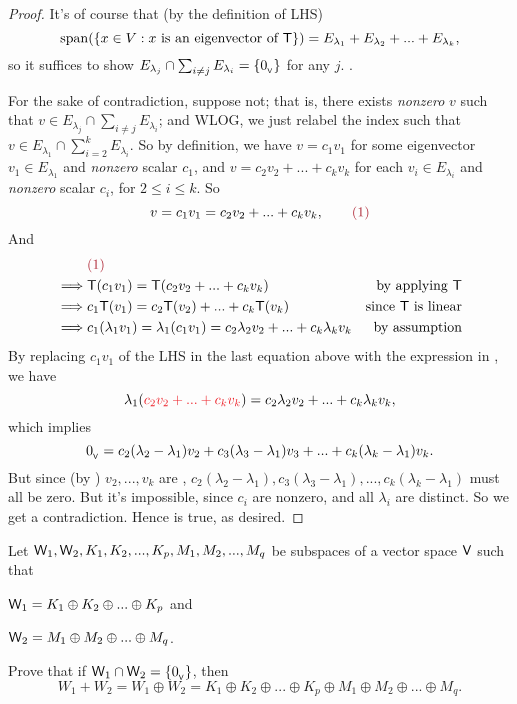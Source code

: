 \begin{proof}
It's of course that (by the definition of LHS)
\[
    \operatorname{span}(\{ x \in V: x \text{ is an eigenvector of } \textsf{T} \}) = E_{\lambda_1} + E_{\lambda_2} + ... + E_{\lambda_k},
\]
so it suffices to show \(E_{\lambda_j} \cap \sum_{i \ne j} E_{\lambda_i} = \{ 0_{_{\textsf{V}}} \}\) for any \(j\). .

For the sake of contradiction, suppose not;
that is, there exists \emph{nonzero} \(v\) such that \(v \in E_{\lambda_j} \cap \sum_{i \ne j} E_{\lambda_i}\);
and WLOG, we just relabel the index such that
\(v \in E_{\lambda_1} \cap \sum_{i = 2}^k E_{\lambda_i}\).
So by definition, we have \(v = c_1 v_1\) for some eigenvector \(v_1 \in E_{\lambda_1}\) and \emph{nonzero} scalar \(c_1\), and \(v = c_2 v_2 + ... + c_k v_k\) for each \(v_i \in E_{\lambda_i}\) and \emph{nonzero} scalar \(c_i\), for \(2 \le i \le k\).
So
\[
    v = c_1 v_1 = c_2 v_2 + ... + c_k v_k, \quad \quad \MAROON{(1)}
\]
And
\begin{align*}
             & \MAROON{(1)} \\
    \implies & \T(c_1 v_1) = \T(c_2 v_2 + ... + c_k v_k) & \text{by applying \(\T\)} \\
    \implies & c_1\T(v_1) = c_2\T(v_2) + ... + c_k\T(v_k) & \text{since \(\T\) is linear} \\
    \implies & c_1 (\lambda_1 v_1) = \lambda_1 (c_1 v_1) = c_2 \lambda_2 v_2 + ... + c_k \lambda_k v_k & \text{by assumption}
\end{align*}
By replacing \(c_1 v_1\) of the LHS in the last equation above with the expression in , we have
\[
    \lambda_1 (\RED{c_2 v_2 + ... + c_k v_k}) = c_2 \lambda_2 v_2 + ... + c_k \lambda_k v_k,
\]
which implies
\[
    0_{_{\textsf{V}}} = c_2 (\lambda_2 - \lambda_1) v_2 + c_3 (\lambda_3 - \lambda_1) v_3 + ... + c_k (\lambda_k - \lambda_1) v_k.
\]
But since (by ) \(v_2, ..., v_k\) are \LID{}, \(c_2(\lambda_2 - \lambda_1), c_3(\lambda_3 - \lambda_1), ..., c_k(\lambda_k - \lambda_1)\) must all be zero.
But it's impossible, since \(c_i\) are nonzero, and all \(\lambda_i\) are distinct.
So we get a contradiction.
Hence  is true, as desired.
\end{proof}

\begin{exercise} \label{exercise 5.2.24}
Let \(\textsf{W}_1, \textsf{W}_2, K_1, K_2, ..., K_p, M_1, M_2, ..., M_q\) be subspaces of a vector space \(\textsf{V}\) such that

 \(\textsf{W}_1 = K_1 \oplus K_2 \oplus ... \oplus K_p\) and

 \(\textsf{W}_2 = M_1 \oplus M_2 \oplus ... \oplus M_q\).

Prove that if  \(\textsf{W}_1 \cap \textsf{W}_2 = \{ 0_{_{\textsf{V}}} \}\), then
\[
    W_1 + W_2 = W_1 \oplus W_2 = K_1 \oplus K_2 \oplus ... \oplus K_p \oplus M_1 \oplus M_2 \oplus ... \oplus M_q.
\]
\end{exercise}

